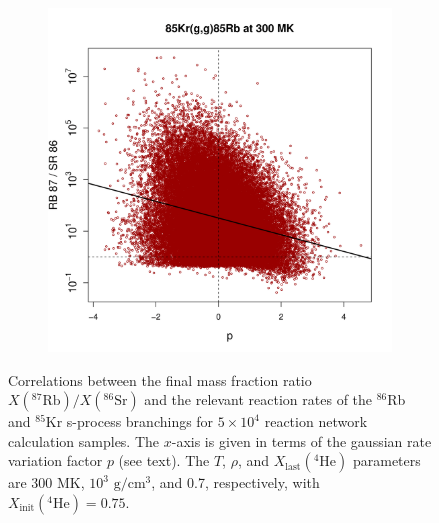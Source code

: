 \begin{figure}[t]
\begin{subfigure}[b]{0.495\textwidth}
\end{subfigure}
\hfill
\begin{subfigure}[b]{0.495\textwidth}   
\centering 
\includegraphics[width=\textwidth]{Chapter-3/figs/CorrRB87SR86_85Kr_g_g_85Rb_300MK.png}
\end{subfigure}
\caption{\label{fig:Correlations_86Rb_Branch}Correlations between the final mass fraction ratio $X(^{87}\mathrm{Rb})/X(^{86}\mathrm{Sr})$ and the relevant reaction rates of the $^{86}$Rb and $^{85}$Kr s-process branchings for $5 \times 10^{4}$ reaction network calculation samples. The $x$-axis is given in terms of the gaussian rate variation factor $p$ (see text). The $T$, $\rho$, and $X_{\mathrm{last}}(^{4}\mathrm{He})$ parameters are 300 MK, $10^{3}$ $\mathrm{g}/\mathrm{cm}^{3}$, and 0.7, respectively, with $X_{\mathrm{init}}(^{4}\mathrm{He}) = 0.75$.} 
\end{figure}

